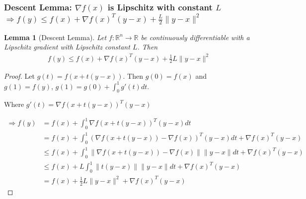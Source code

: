 \documentclass[11pt,a4paper]{article}
\newtheorem{lemma}{Lemma}
\begin{document}
\subsubsection{Descent Lemma: $\nabla f(x)$ is Lipschitz with constant $L$ $\Rightarrow	f(y)\leq f(x)+\nabla f(x)^T(y-x)+\frac{L}{2}\|y-x\|^2$}
\begin{lemma}[Descent Lemma]
Let $f: \mathbb{R}^n \rightarrow \mathbb{R}$ be continuously differentiable with a Lipschitz gradient with Lipschitz constant $L$. Then
\begin{equation}
    \begin{aligned}
        f(y)\leq f(x)+\nabla f(x)^T(y-x)+\frac{1}{2}L\|y-x\|^2
    \end{aligned}
    \nonumber
\end{equation}
\end{lemma}
\begin{proof}
Let $g(t)=f(x+t(y-x))$. Then $g(0)=f(x)$ and $g(1)=f(y)$, $g(1)=g(0)+\int_0^1g'(t)dt$.

Where $g'(t)=\nabla f(x+t(y-x))^T(y-x)$

\begin{equation}
    \begin{aligned}
        \Rightarrow	f(y)&=f(x)+\int_0^1\nabla f(x+t(y-x))^T(y-x)dt\\
        &=f(x)+\int_0^1(\nabla f(x+t(y-x))-\nabla f(x))^T(y-x)dt+\nabla f(x)^T(y-x)\\
        &\leq f(x)+\int_0^1\|\nabla f(x+t(y-x))-\nabla f(x)\|\|y-x\|dt+\nabla f(x)^T(y-x)\\
        &\leq f(x)+L\int_0^1\|t(y-x)\|\|y-x\|dt+\nabla f(x)^T(y-x)\\
        &=f(x)+\frac{1}{2}L\|y-x\|^2+\nabla f(x)^T(y-x)
    \end{aligned}
    \nonumber
\end{equation}
\end{proof}
\end{document}
